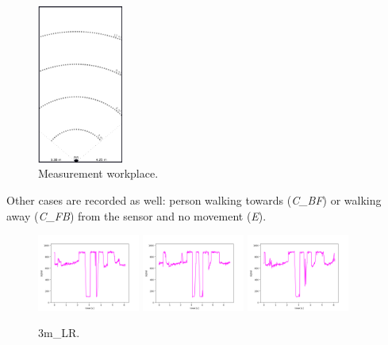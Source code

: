 \begin{figure}[!ht]
\begin{center}
\includegraphics[width=0.25\textwidth]{obrazky-figures/measurement.png}
\caption{Measurement workplace.\label{fig:measurement}}
\end{center}
\end{figure}

Other cases are recorded as well: person walking towards ({\it C\_BF})
or walking away ({\it C\_FB}) from the sensor and no movement ({\it E}). 

\begin{figure}[!ht]
\begin{center}
\includegraphics[width=0.3\textwidth]{../data/3m_LR/3m_LR_1.png}
\includegraphics[width=0.3\textwidth]{../data/3m_LR/3m_LR_2.png}
\includegraphics[width=0.3\textwidth]{../data/3m_LR/3m_LR_3.png}
\caption{3m\_LR.\label{fig:3m_LR}}
\end{center}
\end{figure}

